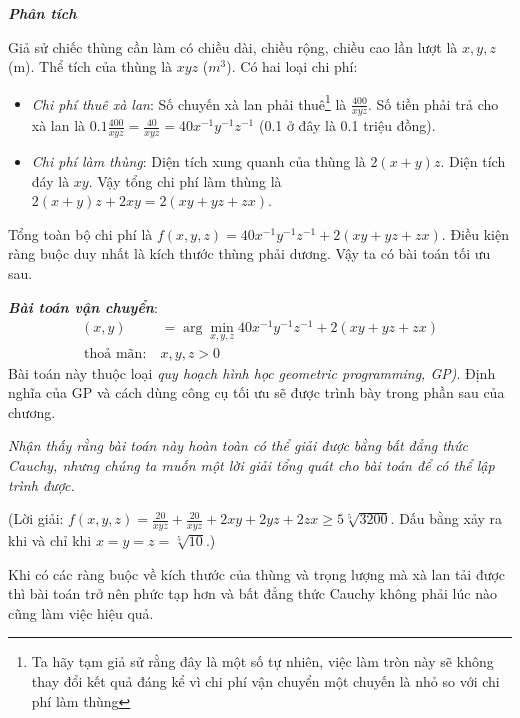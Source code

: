  
\textit{\textbf{Phân tích}}

Giả sử chiếc thùng cần làm có chiều dài, chiều rộng, chiều cao lần lượt là $x,
y, z$ (m). Thể tích của thùng là $xyz$ ($m^3$). Có hai loại chi phí:
\begin{itemize}
    \item \textit{Chi phí thuê xà lan}: Số chuyến xà lan phải thuê\footnote{Ta
    hãy tạm giả sử rằng đây là một số tự nhiên, việc làm tròn này sẽ không thay
    đổi kết quả đáng kể vì chi phí vận chuyển một chuyến là nhỏ so với chi phí
    làm thùng} là $\frac{400}{xyz}$. Số tiền phải trả cho xà lan là
    $\displaystyle 0.1\frac{400}{xyz} = \frac{40}{xyz} = 40x^{-1}y^{-1}z^{-1}$
    (0.1 ở đây là 0.1 triệu đồng).
    \item \textit{Chi phí làm thùng}: Diện tích xung quanh của thùng là $2 (x +
    y)z $. Diện tích đáy là $xy$. Vậy tổng chi phí làm thùng là $2(x +y)z + 2xy
    = 2(xy + yz + zx)$.
\end{itemize}
 
Tổng toàn bộ chi phí là $f(x, y, z) = 40x^{-1}y^{-1}z^{-1} + 2(xy + yz + zx)$.
Điều kiện ràng buộc duy nhất là kích thước thùng phải dương. Vậy ta có
bài toán tối ưu sau.  


\textit{\textbf{Bài toán vận chuyển}}:
\begin{equation} 
\begin{aligned}
    (x, y) &= \arg\min_{x, y, z} 40x^{-1}y^{-1}z^{-1} + 2(xy + yz + zx) \\\ 
    \text{thoả mãn:}~ & x, y, z > 0
\end{aligned}
\end{equation} 
Bài toán này thuộc loại \textit{quy hoạch hình học} \textit{{geometric programming, GP)}}. Định nghĩa của GP
và cách dùng công cụ tối ưu sẽ được trình bày trong phần sau của chương.
 
\textit{Nhận thấy rằng bài toán này hoàn toàn có thể giải được bằng bất
đẳng thức Cauchy, nhưng chúng ta muốn một lời giải tổng quát cho bài toán để có thể lập trình được.}
 
(Lời giải:  
    $f(x, y, z)= \frac{20}{xyz} + \frac{20}{xyz} + 2xy + 2yz + 2zx
    \geq 5\sqrt[5]{3200} $.
Dấu bằng xảy ra khi và chỉ khi $x = y = z = \sqrt[5]{10}$.) 
 
Khi có các ràng buộc về kích thước của thùng và trọng lượng mà xà lan tải được
thì bài toán trở nên phức tạp hơn và bất đẳng thức Cauchy không phải lúc nào cũng làm việc hiệu quả. 

